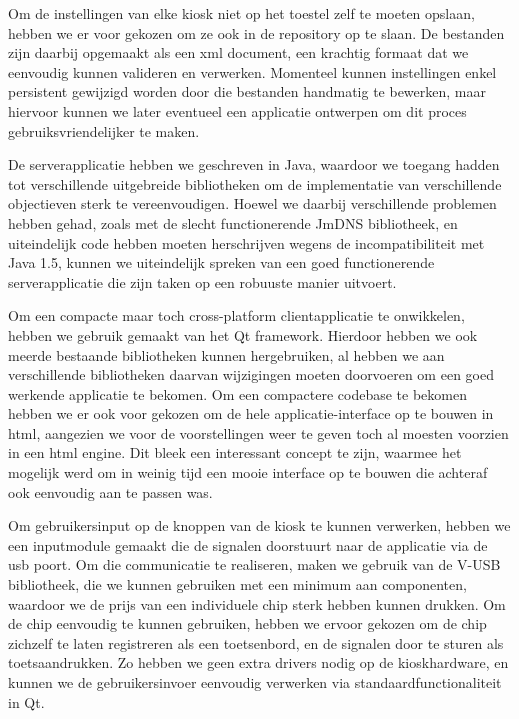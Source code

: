 Om de instellingen van elke kiosk niet op het toestel zelf te moeten opslaan, hebben we er voor gekozen om ze ook in de repository op te slaan. De bestanden zijn daarbij opgemaakt als een \ac{xml} document, een krachtig formaat dat we eenvoudig kunnen valideren en verwerken. Momenteel kunnen instellingen enkel persistent gewijzigd worden door die bestanden handmatig te bewerken, maar hiervoor kunnen we later eventueel een applicatie ontwerpen om dit proces gebruiksvriendelijker te maken.

De serverapplicatie hebben we geschreven in Java, waardoor we toegang hadden tot verschillende uitgebreide bibliotheken om de implementatie van verschillende objectieven sterk te vereenvoudigen. Hoewel we daarbij verschillende problemen hebben gehad, zoals met de slecht functionerende JmDNS bibliotheek, en uiteindelijk code hebben moeten herschrijven wegens de incompatibiliteit met Java 1.5, kunnen we uiteindelijk spreken van een goed functionerende serverapplicatie die zijn taken op een robuuste manier uitvoert.

Om een compacte maar toch cross-platform clientapplicatie te onwikkelen, hebben we gebruik gemaakt van het Qt framework. Hierdoor hebben we ook meerde bestaande bibliotheken kunnen hergebruiken, al hebben we aan verschillende bibliotheken daarvan wijzigingen moeten doorvoeren om een goed werkende applicatie te bekomen. Om een compactere codebase te bekomen hebben we er ook voor gekozen om de hele applicatie-interface op te bouwen in \ac{html}, aangezien we voor de voorstellingen weer te geven toch al moesten voorzien in een \ac{html} engine. Dit bleek een interessant concept te zijn, waarmee het mogelijk werd om in weinig tijd een mooie interface op te bouwen die achteraf ook eenvoudig aan te passen was.

Om gebruikersinput op de knoppen van de kiosk te kunnen verwerken, hebben we een inputmodule gemaakt die de signalen doorstuurt naar de applicatie via de \ac{usb} poort. Om die communicatie te realiseren, maken we gebruik van de V-USB bibliotheek, die we kunnen gebruiken met een minimum aan componenten, waardoor we de prijs van een individuele chip sterk hebben kunnen drukken.
Om de chip eenvoudig te kunnen gebruiken, hebben we ervoor gekozen om de chip zichzelf te laten registreren als een toetsenbord, en de signalen door te sturen als toetsaandrukken. Zo hebben we geen extra drivers nodig op de kioskhardware, en kunnen we de gebruikersinvoer eenvoudig verwerken via standaardfunctionaliteit in Qt.

